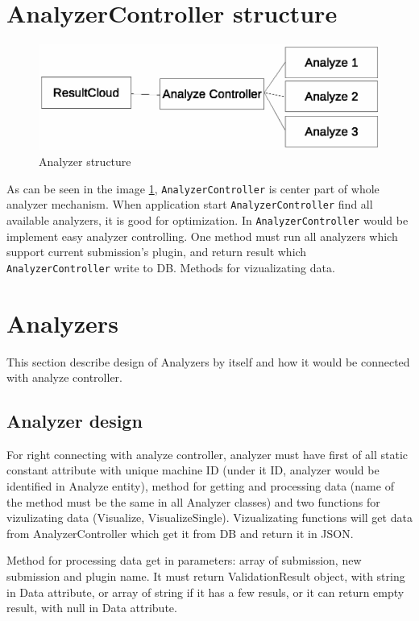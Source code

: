 \section{AnalyzerController structure}

\begin{figure}
  \centering
    \includegraphics[trim=0 22cm 0 0,scale=0.8]{fig/analyzer-struct.eps}
  \caption{Analyzer structure}
  \label{fig:an_struct}
\end{figure}

As can be seen in the image \ref{fig:an_struct}, \texttt{AnalyzerController} is center part of whole analyzer mechanism. When application start \texttt{AnalyzerController} find all available analyzers, it is good for optimization. In \texttt{AnalyzerController} would be implement easy analyzer controlling. One method must run all analyzers which support current submission's plugin, and return result which \texttt{AnalyzerController} write to DB. Methods for vizualizating data.

\section{Analyzers}

This section describe design of Analyzers by itself and how it would be connected with analyze controller.

\subsection{Analyzer design}

For right connecting with analyze controller, analyzer must have first of all static constant attribute with unique machine ID (under it ID, analyzer would be identified in Analyze entity), method for getting and processing data (name of the method must be the same in all Analyzer classes) and two functions for vizulizating data (Visualize, VisualizeSingle). Vizualizating functions will get data from AnalyzerController which get it from DB and return it in JSON.

Method for processing data get in parameters: array of submission, new submission and plugin name. It must return ValidationResult object, with string in Data attribute, or array of string if it has a few resuls, or it can return empty result, with null in Data attribute.


